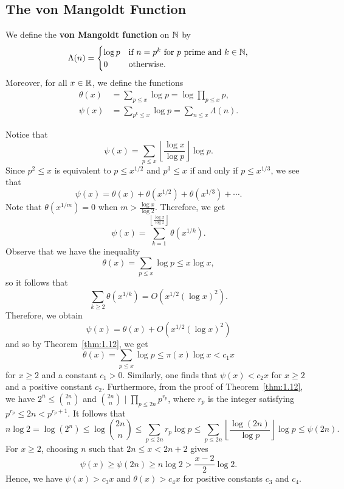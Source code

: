 \subsection{The von Mangoldt Function}\label{subsec:2.2}

\begin{defn}\label{def:2.6}
We define the {\bf von Mangoldt function} on $\mathbb{N}$ by 
\[ \Lambda(n) = \begin{cases} \log p & \text{if $n = p^k$ for $p$ prime and $k \in \mathbb{N}$,} \\ 0 & \text{otherwise.} \end{cases} \]
Moreover, for all $x \in \mathbb{R}$, we define the functions 
\begin{align*}
    \theta(x) &= \sum_{p\leq x} \log p = \log \prod_{p \leq x} p, \\ 
    \psi(x) &= \sum_{p^k \leq x} \log p = \sum_{n \leq x} \Lambda(n). 
\end{align*}
\end{defn}

Notice that 
\[ \psi(x) = \sum_{p\leq x} \left\lfloor \frac{\log x}{\log p} \right\rfloor \log p. \]
Since $p^2 \leq x$ is equivalent to $p \leq x^{1/2}$ and $p^3 \leq x$ if and only if $p \leq x^{1/3}$, 
we see that 
\[ \psi(x) = \theta(x) + \theta(x^{1/2}) + \theta(x^{1/3}) + \cdots. \]
Note that $\theta(x^{1/m}) = 0$ when $m > \frac{\log x}{\log 2}$. Therefore, we get 
\[ \psi(x) = \sum_{k=1}^{\left\lfloor \frac{\log x}{\log 2} \right\rfloor} \theta(x^{1/k}). \]
Observe that we have the inequality 
\[ \theta(x) = \sum_{p\leq x} \log p \leq x \log x, \]
so it follows that 
\[ \sum_{k \geq 2} \theta(x^{1/k}) = O\left( x^{1/2} (\log x)^2 \right). \]
Therefore, we obtain 
\[ \psi(x) = \theta(x) + O\left( x^{1/2} (\log x)^2 \right) \]
and so by Theorem~\ref{thm:1.12}, we get 
\[ \theta(x) = \sum_{p\leq x}\log p \leq \pi(x) \log x < c_1 x \]
for $x \geq 2$ and a constant $c_1 > 0$. Similarly, one finds that $\psi(x) < c_2x$ for $x \geq 2$
and a positive constant $c_2$. Furthermore, from the proof of Theorem~\ref{thm:1.12}, we have $2^n \leq \binom{2n}n$
and $\binom{2n}n \mid \prod_{p \leq 2n} p^{r_p}$, where $r_p$ is the integer satisfying 
$p^{r_p} \leq 2n < p^{r_p+1}$. It follows that 
\[ n\log 2 = \log(2^n) \leq \log \binom{2n}n \leq \sum_{p\leq 2n} r_p \log p \leq 
\sum_{p \leq 2n} \left\lfloor \frac{\log(2n)}{\log p} \right\rfloor \log p \leq \psi(2n). \]
For $x \geq 2$, choosing $n$ such that $2n \leq x < 2n+2$ gives 
\[ \psi(x) \geq \psi(2n) \geq n\log 2 > \frac{x-2}2 \log 2. \]
Hence, we have $\psi(x) > c_3x$ and $\theta(x) > c_4x$ for positive constants $c_3$ and $c_4$. 


